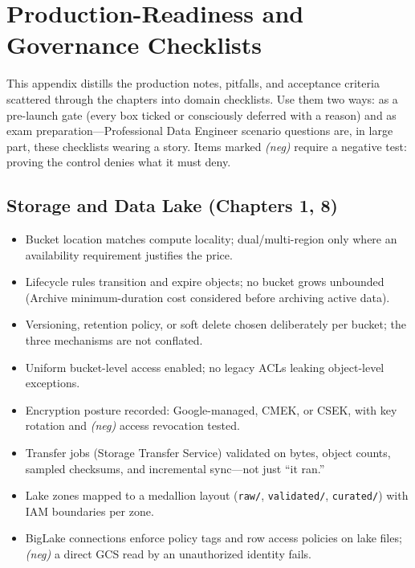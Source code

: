 \chapter{Production-Readiness and Governance Checklists}
%
This appendix distills the production notes, pitfalls, and acceptance criteria scattered through
the chapters into domain checklists. Use them two ways: as a pre-launch gate (every box ticked or
consciously deferred with a reason) and as exam preparation---Professional Data Engineer scenario
questions are, in large part, these checklists wearing a story. Items marked \emph{(neg)} require
a negative test: proving the control denies what it must deny.

\section{Storage and Data Lake (Chapters 1, 8)}
\begin{itemize}
    \item[$\square$] Bucket location matches compute locality; dual/multi-region only where an
    availability requirement justifies the price.
    \item[$\square$] Lifecycle rules transition and expire objects; no bucket grows unbounded
    (Archive minimum-duration cost considered before archiving active data).
    \item[$\square$] Versioning, retention policy, or soft delete chosen deliberately per bucket;
    the three mechanisms are not conflated.
    \item[$\square$] Uniform bucket-level access enabled; no legacy ACLs leaking object-level
    exceptions.
    \item[$\square$] Encryption posture recorded: Google-managed, CMEK, or CSEK, with key rotation
    and \emph{(neg)} access revocation tested.
    \item[$\square$] Transfer jobs (Storage Transfer Service) validated on bytes, object counts,
    sampled checksums, and incremental sync---not just ``it ran.''
    \item[$\square$] Lake zones mapped to a medallion layout (\texttt{raw/}, \texttt{validated/},
    \texttt{curated/}) with IAM boundaries per zone.
    \item[$\square$] BigLake connections enforce policy tags and row access policies on lake files;
    \emph{(neg)} a direct GCS read by an unauthorized identity fails.
\end{itemize}

